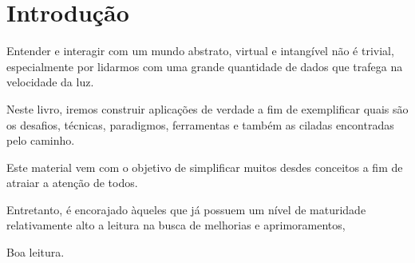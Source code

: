 \chapter{Introdução}
Entender e interagir com um mundo abstrato, virtual e intangível não é trivial, especialmente por lidarmos com uma grande quantidade de dados que trafega na velocidade da luz.

Neste livro, iremos construir aplicações de verdade a fim de exemplificar quais são os desafios, técnicas, paradigmos, ferramentas e também as ciladas encontradas pelo caminho. 

Este material vem com o objetivo de simplificar muitos desdes conceitos a fim de atraiar a atenção de todos.

Entretanto, é encorajado àqueles que já possuem um nível de maturidade relativamente alto a leitura na busca de melhorias e aprimoramentos, 

Boa leitura.
